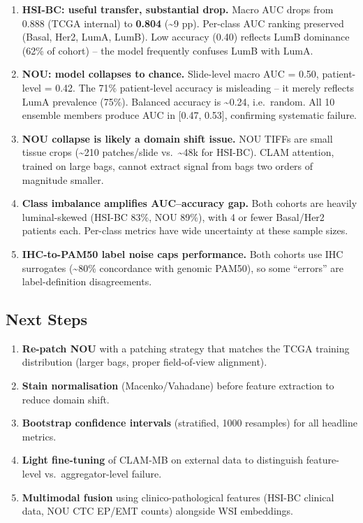\documentclass[11pt]{article}
\providecommand{\tightlist}{%
      \setlength{\itemsep}{0pt}\setlength{\parskip}{0pt}}
\begin{document}
\begin{enumerate}
\def\labelenumi{\arabic{enumi}.}
\item
  \textbf{HSI-BC: useful transfer, substantial drop.} Macro AUC drops
  from 0.888 (TCGA internal) to \textbf{0.804} (\textasciitilde{}9 pp).
  Per-class AUC ranking preserved (Basal, Her2, LumA, LumB). Low
  accuracy (0.40) reflects LumB dominance (62\% of cohort) -- the model
  frequently confuses LumB with LumA.
\item
  \textbf{NOU: model collapses to chance.} Slide-level macro AUC = 0.50,
  patient-level = 0.42. The 71\% patient-level accuracy is misleading --
  it merely reflects LumA prevalence (75\%). Balanced accuracy is
  \textasciitilde{}0.24, i.e.~random. All 10 ensemble members produce
  AUC in {[}0.47, 0.53{]}, confirming systematic failure.
\item
  \textbf{NOU collapse is likely a domain shift issue.} NOU TIFFs are
  small tissue crops (\textasciitilde{}210 patches/slide
  vs.~\textasciitilde{}48k for HSI-BC). CLAM attention, trained on large
  bags, cannot extract signal from bags two orders of magnitude smaller.
\item
  \textbf{Class imbalance amplifies AUC--accuracy gap.} Both cohorts are
  heavily luminal-skewed (HSI-BC 83\%, NOU 89\%), with 4 or fewer
  Basal/Her2 patients each. Per-class metrics have wide uncertainty at
  these sample sizes.
\item
  \textbf{IHC-to-PAM50 label noise caps performance.} Both cohorts use
  IHC surrogates (\textasciitilde{}80\% concordance with genomic PAM50),
  so some ``errors'' are label-definition disagreements.
\end{enumerate}

    \hypertarget{next-steps}{%
\subsection{Next Steps}\label{next-steps}}

\begin{enumerate}
\def\labelenumi{\arabic{enumi}.}
\tightlist
\item
  \textbf{Re-patch NOU} with a patching strategy that matches the TCGA
  training distribution (larger bags, proper field-of-view alignment).
\item
  \textbf{Stain normalisation} (Macenko/Vahadane) before feature
  extraction to reduce domain shift.
\item
  \textbf{Bootstrap confidence intervals} (stratified, 1000 resamples)
  for all headline metrics.
\item
  \textbf{Light fine-tuning} of CLAM-MB on external data to distinguish
  feature-level vs.~aggregator-level failure.
\item
  \textbf{Multimodal fusion} using clinico-pathological features (HSI-BC
  clinical data, NOU CTC EP/EMT counts) alongside WSI embeddings.
\end{enumerate}
\end{document}
